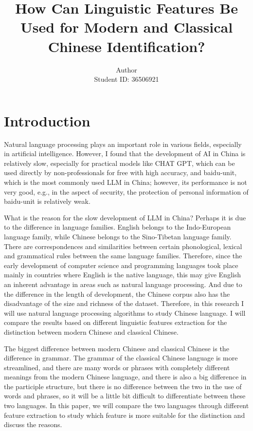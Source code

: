 \documentclass[11pt]{article}
\title{How Can Linguistic Features Be Used for Modern and Classical Chinese Identification?}
\author{Author \\
  Student ID: 36506921 \\}
\begin{document}
\maketitle
\section{Introduction}

Natural language processing plays an important role in various fields, especially in artificial intelligence. However, I found that the development of AI in China is relatively slow, especially for practical models like CHAT GPT, which can be used directly by non-professionals for free with high accuracy, and baidu-unit, which is the most commonly used LLM in China; however, its performance is not very good, e.g., in the aspect of security, the protection of personal information of baidu-unit is relatively weak. 

What is the reason for the slow development of LLM in China? Perhaps it is due to the difference in language families. English belongs to the Indo-European language family, while Chinese belongs to the Sino-Tibetan language family. There are correspondences and similarities between certain phonological, lexical and grammatical rules between the same language families. Therefore, since the early development of computer science and programming languages took place mainly in countries where English is the native language, this may give English an inherent advantage in areas such as natural language processing. And due to the difference in the length of development, the Chinese corpus also has the disadvantage of the size and richness of the dataset. Therefore, in this research I will use natural language processing algorithms to study Chinese language. I will compare the results based on different linguistic features extraction for the distinction between modern Chinese and classical Chinese.

The biggest difference between modern Chinese and classical Chinese is the difference in grammar. The grammar of the classical Chinese language is more streamlined, and there are many words or phrases with completely different meanings from the modern Chinese language, and there is also a big difference in the participle structure, but there is no difference between the two in the use of words and phrases, so it will be a little bit difficult to differentiate between these two languages. In this paper, we will compare the two languages through different feature extraction to study which feature is more suitable for the distinction and discuss the reasons.
\end{document}
